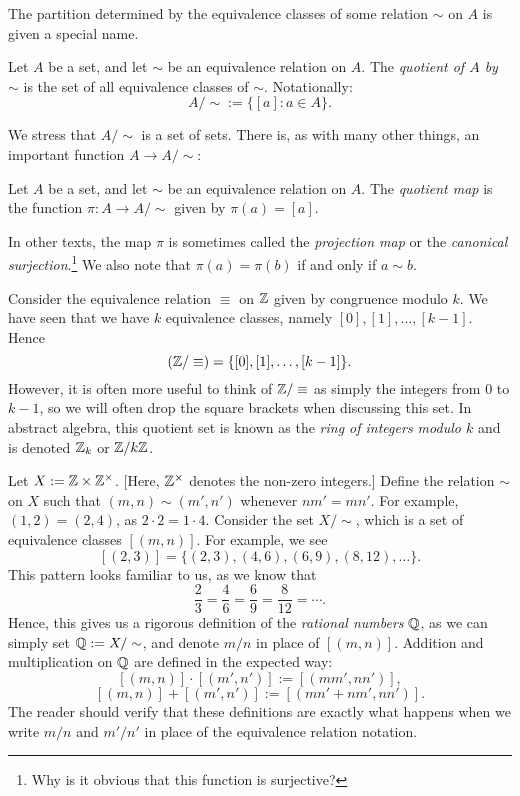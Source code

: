 \documentclass{article}
\begin{document}
The partition determined by the equivalence classes of some relation $\sim$ on $A$ is given a special name.

\begin{definition}
Let $A$ be a set, and let $\sim$ be an equivalence relation on $A$. The \textit{quotient of $A$ by $\sim$} is the set of all equivalence classes of $\sim$. Notationally:
$$A/\sim := \{[a]: a\in A\}.$$
\end{definition}
We stress that $A/\sim$ is a set of sets. There is, as with many other things, an important function $A \to A/\sim$:

\begin{definition}
Let $A$ be a set, and let $\sim$ be an equivalence relation on $A$. The \textit{quotient map} is the function $\pi: A \to A/\sim$ given by $\pi(a) = [a]$.
\end{definition}

In other texts, the map $\pi$ is sometimes called the \textit{projection map} or the \textit{canonical surjection}.\footnote{Why is it obvious that this function is surjective?} We also note that $\pi(a) = \pi(b)$ if and only if $a\sim b$.

\begin{example}
Consider the equivalence relation $\equiv$ on $\mathbb Z$ given by congruence modulo $k$. We have seen that we have $k$ equivalence classes, namely $[0], [1], \ldots, [k-1]$. Hence
$$(\mathbb Z/\equiv) = \{[0], [1], \ldots, [k-1]\}.$$
However, it is often more useful to think of $\mathbb Z/\equiv$ as simply the integers from $0$ to $k-1$, so we will often drop the square brackets when discussing this set. In abstract algebra, this quotient set is known as the \textit{ring of integers modulo $k$} and is denoted $\mathbb Z_k$ or $\mathbb Z/k\mathbb Z$.
\end{example}

\begin{example}
Let $X := \mathbb Z \times \mathbb Z^\times$. [Here, $\mathbb Z^\times$ denotes the non-zero integers.] Define the relation $\sim$ on $X$ such that $(m,n) \sim (m', n')$ whenever $nm' = mn'$. For example, $(1, 2) = (2,4)$, as $2\cdot 2 = 1\cdot 4$. Consider the set $X/\sim$, which is a set of equivalence classes $[(m, n)]$. For example, we see
$$[(2, 3)] = \{(2, 3), (4, 6), (6, 9), (8, 12), \ldots\}.$$
This pattern looks familiar to us, as we know that
$$\frac 23 = \frac 46 = \frac 69 = \frac 8{12} = \cdots.$$
Hence, this gives us a rigorous definition of the \textit{rational numbers} $\mathbb Q$, as we can simply set $\mathbb Q := X/\sim$, and denote $m/n$ in place of $[(m, n)]$. Addition and multiplication on $\mathbb Q$ are defined in the expected way:
$$[(m,n)]\cdot [(m', n')] := [(mm', nn')],$$
$$[(m,n)] + [(m', n')] := [(mn' + nm', nn')].$$
The reader should verify that these definitions are exactly what happens when we write $m/n$ and $m'/n'$ in place of the equivalence relation notation.
\end{example}
\end{document}
